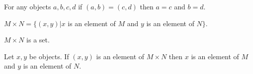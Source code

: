 \documentclass[11pt]{article}
\begin{document}
\begin{forthel}
\begin{axiom}
For any objects $a,b,c,d$ if $(a,b) = (c,d)$ then $a = c$
and $b = d$.
\end{axiom}

\begin{definition}
$M \times N = \{(x,y) | x$ is an element of $M$ and $y$
is an element of $N\}$.
\end{definition}

\begin{axiom}
$M \times N$ is a set.
\end{axiom}

\begin{lemma}
Let $x,y$ be objects.
If $(x,y)$ is an element of $M \times N$ then $x$ is an
element of $M$ and $y$ is an element of $N$.
\end{lemma}

\end{forthel}
\end{document}
